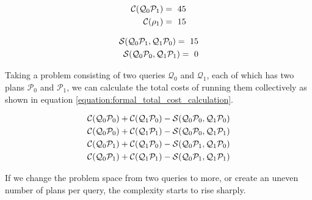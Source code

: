 \begin{equation}
    \centering
    \begin{split}
        \mathcal{C}(\mathcal{Q}_0\mathcal{P}_1) =\ 45 \\
        \mathcal{C}(\rho_1) =\ 15 \\
    \end{split}
    \label{equation:formal_cost_function}
\end{equation}

\begin{equation}
    \centering
    \begin{split}
        \mathcal{S}(\mathcal{Q}_0\mathcal{P}_1, \mathcal{Q}_1\mathcal{P}_0) =\ 15 \\
        \mathcal{S}(\mathcal{Q}_0\mathcal{P}_0, \mathcal{Q}_1\mathcal{P}_1) =\ 0 \\
    \end{split}
    \label{equation:formal_savings_function}
\end{equation}


Taking a problem consisting of two queries $\mathcal{Q}_0$ and $\mathcal{Q}_1$, each of which has two plans $\mathcal{P}_0$ and $\mathcal{P}_1$, we can calculate the total costs of running them collectively as shown in equation \ref{equation:formal_total_cost_calculation}.

\begin{equation}
    \centering
    \begin{split}
        \mathcal{C}(\mathcal{Q}_0\mathcal{P}_0) + \mathcal{C}(\mathcal{Q}_1\mathcal{P}_0) - \mathcal{S}(\mathcal{Q}_0\mathcal{P}_0, \mathcal{Q}_1\mathcal{P}_0) \\
        \mathcal{C}(\mathcal{Q}_0\mathcal{P}_0) + \mathcal{C}(\mathcal{Q}_1\mathcal{P}_1) - \mathcal{S}(\mathcal{Q}_0\mathcal{P}_0, \mathcal{Q}_1\mathcal{P}_1) \\
        \mathcal{C}(\mathcal{Q}_0\mathcal{P}_1) + \mathcal{C}(\mathcal{Q}_1\mathcal{P}_0) - \mathcal{S}(\mathcal{Q}_0\mathcal{P}_1, \mathcal{Q}_1\mathcal{P}_0) \\
        \mathcal{C}(\mathcal{Q}_0\mathcal{P}_1) + \mathcal{C}(\mathcal{Q}_1\mathcal{P}_1) - \mathcal{S}(\mathcal{Q}_0\mathcal{P}_1, \mathcal{Q}_1\mathcal{P}_1) \\
    \end{split}
    \label{equation:formal_total_cost_calculation}
\end{equation}

If we change the problem space from two queries to more, or create an uneven number of plans per query, the complexity starts to rise sharply.


